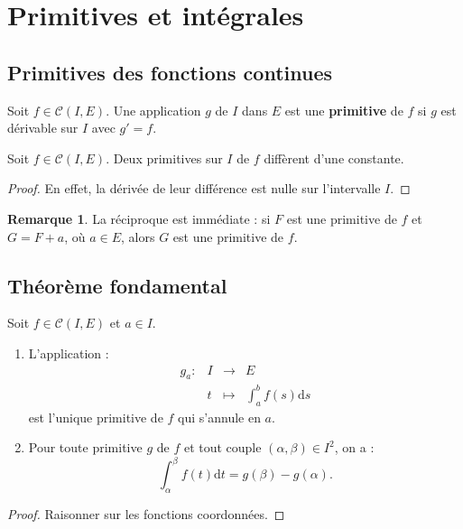 \documentclass[french]{article}
\renewcommand{\d}{\text{d}}
\theoremstyle{plain}
\theoremstyle{definition}
\newtheorem*{rmq}{Remarque}
\theoremstyle{remark}
\begin{document}
\section{Primitives et intégrales}

\subsection{Primitives des fonctions continues}

\begin{dfn}
	Soit $f\in\mathcal{C}(I,E)$. Une application $g$ de $I$ dans $E$ est une \textbf{primitive} de $f$ si $g$ est dérivable sur $I$ avec $g'=f$.
\end{dfn}

\begin{prop}%
	Soit $f\in\mathcal{C}(I,E)$. Deux primitives sur $I$ de $f$ diffèrent d'une constante.
\end{prop}
\begin{proof}
	En effet, la dérivée de leur différence est nulle sur l'intervalle $I$.
\end{proof}

\begin{rmq}
	La réciproque est immédiate : si $F$ est une primitive de $f$ et $G=F+a$, où $a\in E$, alors $G$ est une primitive de $f$.
\end{rmq}

\subsection{Théorème fondamental}

\begin{thm}%
	Soit $f\in\mathcal{C}(I,E)$ et $a\in I$.
	\begin{enumerate}
		\item L'application :
		$$\begin{array}{lrcl}
			g_a:&I&\longrightarrow&E\\
			&t&\longmapsto&\displaystyle\int_{a}^{b}f(s)\d s
		\end{array}$$ est l'unique primitive de $f$ qui s'annule en $a$.
		\item Pour toute primitive $g$ de $f$ et tout couple $(\alpha,\beta)\in I^2$, on a :
		$$\int_{\alpha}^{\beta}f(t)\d t=g(\beta)-g(\alpha).$$
	\end{enumerate}
\end{thm}
\begin{proof}
	Raisonner sur les fonctions coordonnées.
\end{proof}
\end{document}
